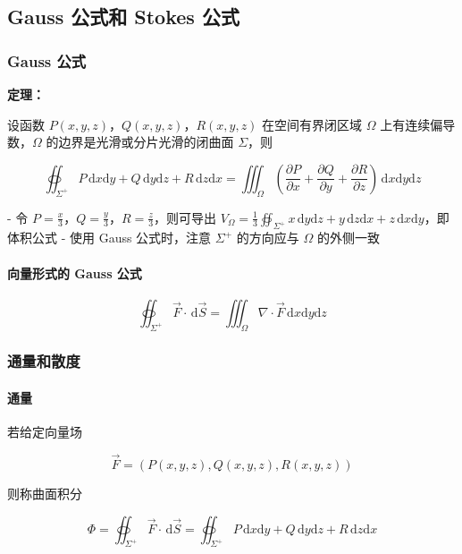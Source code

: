 \documentclass[lang = zh , final , oneside , openany , titlepage , zihao = -4 , linespread = 1.3 , baselineskip = false , cjk-font = windows , text-font = newtx , math-font = newtx]{sjtureport}
\begin{document}
\subsection{Gauss 公式和 Stokes 公式}

\subsubsection{Gauss 公式}

\textbf{定理：}

设函数 \(P(x,y,z)\)，\(Q(x,y,z)\)，\(R(x,y,z)\) 在空间有界闭区域 \(\Omega\) 上有连续偏导数，\(\Omega\) 的边界是光滑或分片光滑的闭曲面 \(\Sigma\)，则

\[
\oiint_{\Sigma^+} P\,\mathrm{d}x\mathrm{d}y + Q\,\mathrm{d}y\mathrm{d}z + R\,\mathrm{d}z\mathrm{d}x = \iiint_\Omega \left(\frac{\partial P}{\partial x} + \frac{\partial Q}{\partial y} + \frac{\partial R}{\partial z}\right)\,\mathrm{d}x\mathrm{d}y\mathrm{d}z
\]

- 令 \(P=\frac{x}{3}\)，\(Q=\frac{y}{3}\)，\(R=\frac{z}{3}\)，则可导出 \(V_\Omega = \frac{1}{3}\oiint_{\Sigma^+} x\,\mathrm{d}y\mathrm{d}z + y\,\mathrm{d}z\mathrm{d}x + z\,\mathrm{d}x\mathrm{d}y\)，即体积公式
- 使用 Gauss 公式时，注意 \(\Sigma^+\) 的方向应与 \(\Omega\) 的外侧一致

\paragraph{向量形式的 Gauss 公式}

\[
\oiint_{\Sigma^+} \vec{F}\cdot\,\mathrm{d}\vec{S} = \iiint_\Omega \nabla\cdot\vec{F}\,\mathrm{d}x\mathrm{d}y\mathrm{d}z
\]

\subsubsection{通量和散度}

\paragraph{通量}

若给定向量场

\[
\vec{F} = \left(P(x,y,z),Q(x,y,z),R(x,y,z)\right)
\]

则称曲面积分

\[
\Phi = \oiint_{\Sigma^+} \vec{F}\cdot\,\mathrm{d}\vec{S} = \oiint_{\Sigma^+} P\,\mathrm{d}x\mathrm{d}y + Q\,\mathrm{d}y\mathrm{d}z + R\,\mathrm{d}z\mathrm{d}x
\]
\end{document}
